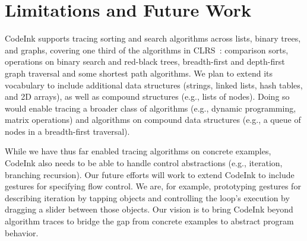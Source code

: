 \section{Limitations and Future Work}
\label{sec:design-and-future-work}

CodeInk supports tracing sorting and search algorithms
across lists, binary trees, and graphs, covering  one third of the algorithms in CLRS~\cite{Cormen2001}:
comparison sorts, operations on binary search and red-black trees,
breadth-first and depth-first graph traversal and some shortest path
algorithms. We plan
to extend its vocabulary to include additional data structures
(strings, linked lists, hash tables, and 2D arrays), as well as compound
structures (e.g., lists of nodes). Doing so would enable tracing a
broader class of algorithms (e.g., dynamic programming, matrix
operations) and algorithms on compound data structures (e.g., a queue of
nodes in a breadth-first traversal).

While we have thus far enabled tracing algorithms on concrete
examples, CodeInk also needs to be able to handle control abstractions
(e.g., iteration, branching recursion). Our future efforts will work
to extend CodeInk to include gestures for specifying flow control. We
are, for example, prototyping gestures for describing iteration by
tapping objects and controlling the loop's execution by dragging a
slider between those objects. Our vision is to bring CodeInk beyond
algorithm traces to bridge the gap from concrete examples to abstract
program behavior.

